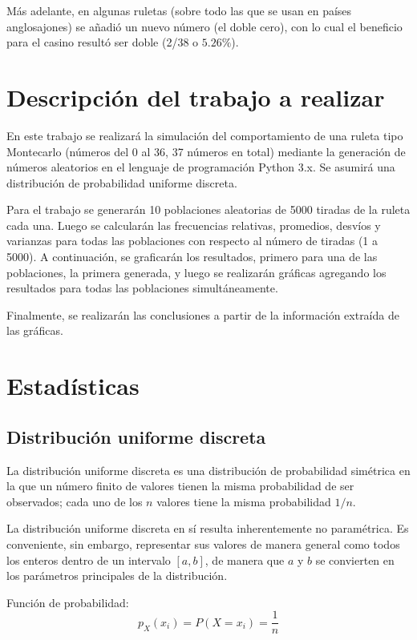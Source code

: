 Más adelante, en algunas ruletas (sobre todo las que se usan en países anglosajones) se añadió un nuevo número (el doble cero), con lo cual el beneficio para el casino resultó ser doble (2/38 o $5.26\%$).

\section{Descripción del trabajo a realizar}
En este trabajo se realizará la simulación del comportamiento de una ruleta tipo Montecarlo (números del 0 al 36, 37 números en total) mediante la generación de números aleatorios en el lenguaje de programación Python 3.x. Se asumirá una distribución de probabilidad uniforme discreta.

Para el trabajo se generarán 10 poblaciones aleatorias de 5000 tiradas de la ruleta cada una. Luego se calcularán las frecuencias relativas, promedios, desvíos y varianzas para todas las poblaciones con respecto al número de tiradas (1 a 5000). A continuación, se graficarán los resultados, primero para una de las poblaciones, la primera generada, y luego se realizarán gráficas agregando los resultados para todas las poblaciones simultáneamente.

Finalmente, se realizarán las conclusiones a partir de la información extraída de las gráficas.

\section{Estadísticas}
\subsection{Distribución uniforme discreta \cite{wiki-uniforme-discreta}}
La distribución uniforme discreta es una distribución de probabilidad simétrica en la que un número finito de valores tienen la misma probabilidad de ser observados; cada uno de los $n$ valores tiene la misma probabilidad $1/n$.

La distribución uniforme discreta en sí resulta inherentemente no paramétrica. Es conveniente, sin embargo, representar sus valores de manera general como todos los enteros dentro de un intervalo $[a,b]$, de manera que $a$ y $b$ se convierten en los parámetros principales de la distribución.

Función de probabilidad:
\begin{equation}
p_X(x_i) = P(X = x_i) = \frac{1}{n}
\end{equation}

